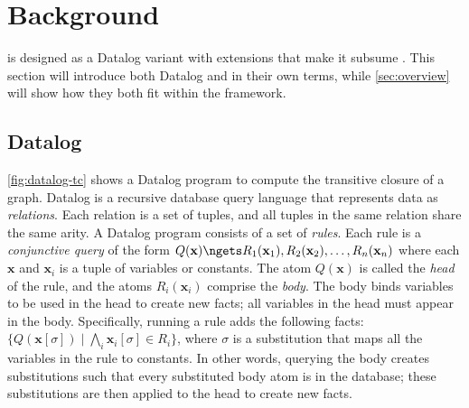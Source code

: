 \section{Background}

\Egglog is designed as a Datalog variant
 with extensions that make it subsume \eqsat.
This section will introduce both Datalog and \eqsat
 in their own terms,
 while \autoref{sec:overview}
 will show how they both fit within the \egglog framework.

\subsection{Datalog}
\label{sec:datalog}

\autoref{fig:datalog-tc}
 shows a Datalog program to compute the transitive closure of a graph.
Datalog is a recursive database query language that
 represents data as \emph{relations}.
Each relation is a set of tuples, and all tuples in 
  the same relation share the same arity.
A Datalog program consists of a set of \emph{rules}.
Each rule is a \emph{conjunctive query} of the form
\(
  Q(\mathbf{x}) \ngets 
  R_1(\mathbf{x}_1), R_2(\mathbf{x}_2), \ldots, R_n(\mathbf{x}_n)
\)
where each $\mathbf{x}$ and $\mathbf{x}_i$ is a tuple of variables or constants. 
The atom $Q(\mathbf{x})$ is called the \emph{head} of the rule, 
  and the atoms $R_i(\mathbf{x}_i)$ comprise the \emph{body}.
The body binds variables to be used in the head to create new facts;
 all variables in the head must appear in the body.
Specifically, running a rule adds the following facts:
\(
  \{
    Q(\mathbf{x}[\sigma]) \mid
    \bigwedge_i \mathbf{x}_i[\sigma] \in R_i
  \}
\),
where $\sigma$ is a substitution 
 that maps all the variables in the rule to constants.
In other words,
 querying the body creates substitutions such that
 every substituted body atom is in the database;
 these substitutions are then applied to the head to create new facts.

